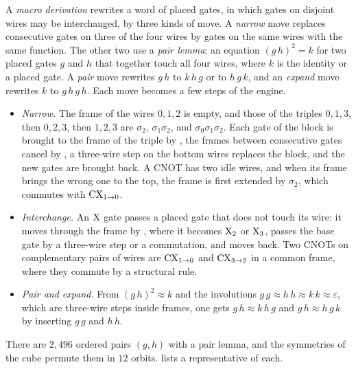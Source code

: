 \documentclass[acmsmall,screen,nonacm]{acmart}
\begin{document}
A \emph{macro derivation} rewrites a word of placed gates, in which gates on disjoint wires may be interchanged, by three kinds of move. A \emph{narrow} move replaces consecutive gates on three of the four wires by gates on the same wires with the same function. The other two use a \emph{pair lemma}: an equation $(g\,h)^2=k$ for two placed gates $g$ and $h$ that together touch all four wires, where $k$ is the identity or a placed gate. A \emph{pair} move rewrites $g\,h$ to $k\,h\,g$ or to $h\,g\,k$, and an \emph{expand} move rewrites $k$ to $g\,h\,g\,h$. Each move becomes a few steps of the engine.
\begin{itemize}
\item \emph{Narrow.} The frame of the wires $0,1,2$ is empty, and those of the triples $0,1,3$, then $0,2,3$, then $1,2,3$ are $\sigma_2$, $\sigma_1\sigma_2$, and $\sigma_0\sigma_1\sigma_2$. Each gate of the block is brought to the frame of the triple by , the frames between consecutive gates cancel by , a three-wire step on the bottom wires replaces the block, and the new gates are brought back. A CNOT has two idle wires, and when its frame brings the wrong one to the top, the frame is first extended by $\sigma_2$, which commutes with $\mathrm{CX}_{1\to0}$.
\item \emph{Interchange.} An $\mathrm{X}$ gate passes a placed gate that does not touch its wire: it moves through the frame by , where it becomes $\mathrm{X}_2$ or $\mathrm{X}_3$, passes the base gate by a three-wire step or a commutation, and moves back. Two CNOTs on complementary pairs of wires are $\mathrm{CX}_{1\to0}$ and $\mathrm{CX}_{3\to2}$ in a common frame, where they commute by a structural rule.
\item \emph{Pair and expand.} From $(g\,h)^2\approx k$ and the involutions $g\,g\approx h\,h\approx k\,k\approx\varepsilon$, which are three-wire steps inside frames, one gets $g\,h\approx k\,h\,g$ and $g\,h\approx h\,g\,k$ by inserting $g\,g$ and $h\,h$.
\end{itemize}

There are $2{,}496$ ordered pairs $(g,h)$ with a pair lemma, and the symmetries of the cube permute them in $12$ orbits.  lists a representative of each.
\end{document}
